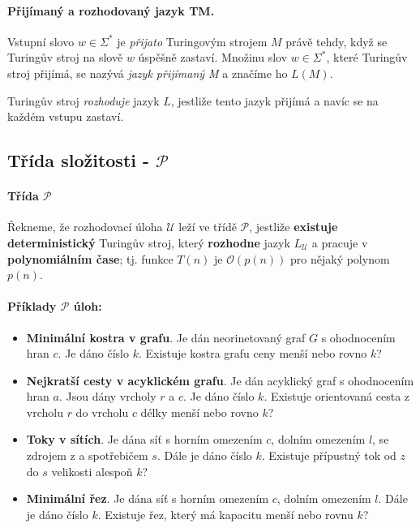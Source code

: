 \paragraph{Přijímaný a rozhodovaný jazyk TM.} Vstupní slovo $w \in \Sigma^*$ je \textit{přijato} Turingovým strojem $M$ právě tehdy, když se Turingův stroj na slově $w$ úspěšně zastaví. Množinu slov $w \in \Sigma^*$, které Turingův stroj přijímá, se nazývá \textit{jazyk přijímaný M} a značíme ho $L(M)$.

Turingův stroj \textit{rozhoduje} jazyk $L$, jestliže tento jazyk přijímá a navíc se na každém vstupu zastaví.

\subsection*{Třída složitosti -  $\mathcal{P}$}
\label{heading:p}

\paragraph{Třída $\mathcal{P}$} Řekneme, že rozhodovací úloha $\mathcal{U}$ leží ve třídě $\mathcal{P}$, jestliže \textbf{existuje deterministický} Turingův stroj, který \textbf{rozhodne} jazyk $L_\mathcal{U}$ a pracuje v \textbf{polynomiálním čase}; tj. funkce $T(n)$ je $\mathcal{O}(p(n))$ pro nějaký polynom $p(n)$.

\paragraph{Příklady $\mathcal{P}$ úloh:}
\begin{itemize}[itemsep=0pt]
    \item \textbf{\color{darkBrown}Minimální kostra v grafu}. Je dán neorinetovaný graf $G$ s ohodnocením hran $c$. Je dáno číslo $k$. Existuje kostra grafu ceny menší nebo rovno $k$?
    
    \item \textbf{\color{darkBrown}Nejkratší cesty v acyklickém grafu}. Je dán acyklický graf s ohodnocením hran $a$. Jsou dány vrcholy $r$ a $c$. Je dáno číslo $k$. Existuje orientovaná cesta z vrcholu $r$ do vrcholu $c$ délky menší nebo rovno $k$?
    
    \item \textbf{\color{darkBrown}Toky v sítích}. Je dána síť s horním omezením $c$, dolním omezením $l$, se zdrojem z a spotřebičem $s$. Dále je dáno číslo $k$. Existuje přípustný tok od $z$ do $s$ velikosti alespoň $k$?
    
    \item \textbf{\color{darkBrown}Minimální řez}. Je dána síť s horním omezením $c$, dolním omezením $l$. Dále je dáno číslo $k$. Existuje řez, který má kapacitu menší nebo rovnu $k$?
\end{itemize}

